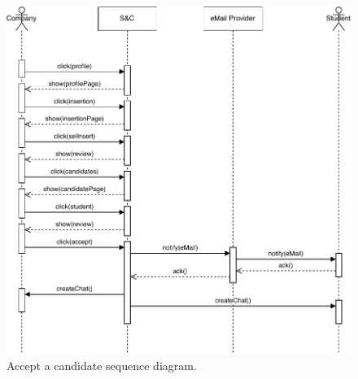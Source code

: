 \begin{figure}[H]
    \begin{center}
        \includegraphics[width=\linewidth]{Images/SequenceDiagram/AcceptCandidateSD.pdf}
        \caption{Accept a candidate sequence diagram.}
        \label{fig:accept_a_candidate_seqdiag}%
    \end{center}
\end{figure}

\newpage


